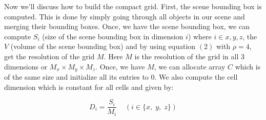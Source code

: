 \documentclass[11pt,a4paper]{article}
\begin{document}
Now we'll discuss how to build the compact grid. First, the scene bounding box is computed. This is done by simply going through all objects in our scene and merging their bounding boxes. Once, we have the scene bounding box, we can compute $S_{i}$ (size of the scene bounding box in dimension $i$) where $i \in {x, y, z}$, the $V$ (volume of the scene bounding box) and by using equation $(2)$ with $\rho = 4$, get the resolution of the grid $M$. Here $M$ is the resolution of the grid in all 3 dimensions or $M_{x} \times M_{y} \times M_{z}$. Once, we have $M$, we can allocate array $C$ which is of the same size and initialize all its entries to 0. We also compute the cell dimension which is constant for all cells and given by:

\begin{equation}
D_{i} = \frac{S_{i}}{M_{i}}\;\;\;\; (i \in \{x,\;y,\;z\})
\end{equation}
\end{document}
